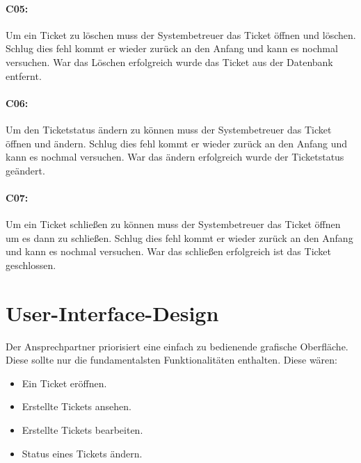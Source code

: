 \paragraph{C05:}
Um ein Ticket zu löschen muss der Systembetreuer das Ticket öffnen und löschen. Schlug dies fehl kommt er wieder zurück an den Anfang und kann es nochmal versuchen. War das Löschen erfolgreich wurde das Ticket aus der Datenbank entfernt.
\paragraph{C06:}
Um den Ticketstatus ändern zu können muss der Systembetreuer das Ticket öffnen und ändern. Schlug dies fehl kommt er wieder zurück an den Anfang und kann es nochmal versuchen. War das ändern erfolgreich wurde der Ticketstatus geändert.
\paragraph{C07:}
Um ein Ticket schließen zu können muss der Systembetreuer das Ticket öffnen um es dann zu schließen. Schlug dies fehl kommt er wieder zurück an den Anfang und kann es nochmal versuchen. War das schließen erfolgreich ist das Ticket geschlossen.

\newpage

\section{User-Interface-Design}
Der Ansprechpartner priorisiert eine einfach zu bedienende grafische Oberfläche. Diese sollte nur die fundamentalsten Funktionalitäten enthalten. Diese wären:

\begin{itemize}
	\item Ein Ticket eröffnen.
	\item Erstellte Tickets ansehen.
	\item Erstellte Tickets bearbeiten.
	\item Status eines Tickets ändern.
\end{itemize}
\paragraph{}

